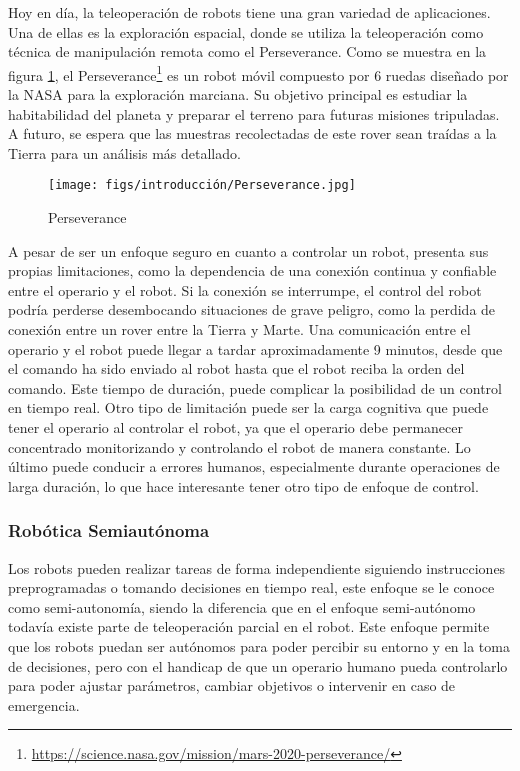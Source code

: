 Hoy en día, la teleoperación de robots tiene una gran variedad de aplicaciones. Una de ellas es la exploración espacial, donde se utiliza la teleoperación
como técnica de manipulación remota como el Perseverance. Como se muestra en la figura \ref{fig:Perseverance}, el Perseverance\footnote{\url{https://science.nasa.gov/mission/mars-2020-perseverance/}} 
es un robot móvil compuesto por 6 ruedas diseñado por la NASA para la exploración marciana. Su objetivo principal es estudiar la habitabilidad del planeta y preparar el terreno para futuras misiones 
tripuladas. A futuro, se espera que las muestras recolectadas de este rover sean traídas a la Tierra para un análisis más detallado.
\begin{figure} [H]
  \begin{center}
    \texttt{[image: figs/introducción/Perseverance.jpg]}
  \end{center}
  \caption{Perseverance}
  \label{fig:Perseverance}
  \vspace{-1.5em}
\end{figure}

A pesar de ser un enfoque seguro en cuanto a controlar un robot, presenta sus propias limitaciones, como la dependencia de una conexión continua y confiable entre
el operario y el robot. Si la conexión se interrumpe, el control del robot podría perderse desembocando situaciones de grave peligro, como la perdida de conexión entre un rover entre 
la Tierra y Marte. Una comunicación entre el operario y el robot puede llegar a tardar aproximadamente 9 minutos, desde que el comando ha sido enviado al robot hasta que el robot 
reciba la orden del comando. Este tiempo de duración, puede complicar la posibilidad de un control en tiempo real.
Otro tipo de limitación puede ser la carga
cognitiva que puede tener el operario al controlar el robot, ya que el operario debe permanecer concentrado monitorizando y controlando el robot de manera constante.
Lo último puede conducir a errores humanos, especialmente durante operaciones de larga duración, lo que hace interesante tener otro tipo de enfoque de control.

\subsubsection{Robótica Semiautónoma}
\label{sec:subseccion}
Los robots pueden realizar tareas de forma independiente siguiendo instrucciones preprogramadas o tomando decisiones en tiempo real, este enfoque se le conoce como semi-autonomía, 
siendo la diferencia que en el enfoque semi-autónomo todavía existe parte de teleoperación parcial en el robot. Este enfoque permite que los robots puedan ser autónomos para poder
percibir su entorno y en la toma de decisiones, pero con el handicap de que un operario humano pueda controlarlo para poder ajustar parámetros, cambiar objetivos o intervenir 
en caso de emergencia. 

